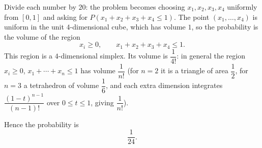 Divide each number by $20$: the problem becomes choosing $x_1,x_2,x_3,x_4$ uniformly from $[0,1]$ and asking for $P(x_1+x_2+x_3+x_4\le1)$. The point $(x_1,\dots,x_4)$ is uniform in the unit $4$-dimensional cube, which has volume $1$, so the probability is the volume of the region
\[
x_i\ge0,\qquad x_1+x_2+x_3+x_4\le1 .
\]
This region is a $4$-dimensional simplex. Its volume is $\dfrac{1}{4!}$: in general the region $x_i\ge0$, $x_1+\cdots+x_n\le1$ has volume $\dfrac{1}{n!}$ (for $n=2$ it is a triangle of area $\dfrac{1}{2}$, for $n=3$ a tetrahedron of volume $\dfrac{1}{6}$, and each extra dimension integrates $\dfrac{(1-t)^{n-1}}{(n-1)!}$ over $0\le t\le1$, giving $\dfrac{1}{n!}$).

Hence the probability is
\[
\boxed{\dfrac{1}{24}}.
\]
